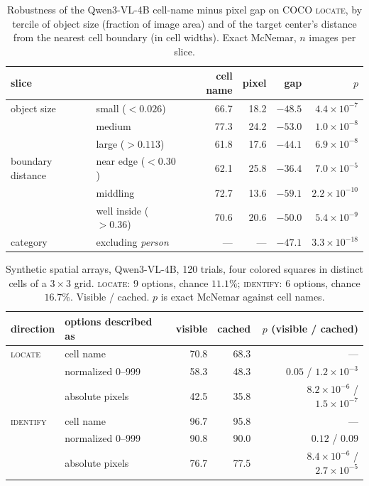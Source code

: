 \documentclass{article}
\begin{document}
\begin{table}[h]
\centering
\caption{Robustness of the Qwen3-VL-4B cell-name minus pixel gap on COCO
\textsc{locate}, by tercile of object size (fraction of image area) and of the
target center's distance from the nearest cell boundary (in cell widths). Exact
McNemar, $n$ images per slice.}
\label{tab:slices}
\begin{tabular}{llrrrr}
\toprule
slice & & cell name & pixel & gap & $p$ \\
\midrule
object size & small ($<0.026$)   & 66.7 & 18.2 & $-48.5$ & $4.4\times10^{-7}$ \\
            & medium             & 77.3 & 24.2 & $-53.0$ & $1.0\times10^{-8}$ \\
            & large ($>0.113$)   & 61.8 & 17.6 & $-44.1$ & $6.9\times10^{-8}$ \\
\midrule
boundary distance & near edge ($<0.30$)  & 62.1 & 25.8 & $-36.4$ & $7.0\times10^{-5}$ \\
                  & middling             & 72.7 & 13.6 & $-59.1$ & $2.2\times10^{-10}$ \\
                  & well inside ($>0.36$)& 70.6 & 20.6 & $-50.0$ & $5.4\times10^{-9}$ \\
\midrule
category & excluding \emph{person} & --- & --- & $-47.1$ & $3.3\times10^{-18}$ \\
\bottomrule
\end{tabular}
\end{table}

\begin{table}[h]
\centering
\caption{Synthetic spatial arrays, Qwen3-VL-4B, 120 trials, four colored squares
in distinct cells of a $3\times3$ grid. \textsc{locate}: 9 options, chance
$11.1\%$; \textsc{identify}: 6 options, chance $16.7\%$. Visible / cached. $p$ is
exact McNemar against cell names.}
\label{tab:synthspace}
\begin{tabular}{llrrr}
\toprule
direction & options described as & visible & cached & $p$ (visible / cached) \\
\midrule
\textsc{locate}   & cell name        & 70.8 & 68.3 & --- \\
                  & normalized 0--999 & 58.3 & 48.3 & $0.05$ / $1.2\times10^{-3}$ \\
                  & absolute pixels  & 42.5 & 35.8 & $8.2\times10^{-6}$ / $1.5\times10^{-7}$ \\
\midrule
\textsc{identify} & cell name        & 96.7 & 95.8 & --- \\
                  & normalized 0--999 & 90.8 & 90.0 & $0.12$ / $0.09$ \\
                  & absolute pixels  & 76.7 & 77.5 & $8.4\times10^{-6}$ / $2.7\times10^{-5}$ \\
\bottomrule
\end{tabular}
\end{table}
\end{document}
